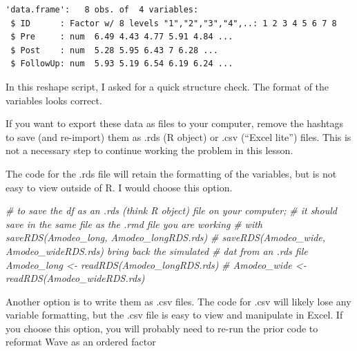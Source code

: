 \documentclass[
  11pt,
]{book}
\newenvironment{Shaded}{\begin{snugshade}}{\end{snugshade}}
\newcommand{\CommentTok}[1]{\textcolor[rgb]{0.56,0.35,0.01}{\textit{#1}}}
\newcommand{\FunctionTok}[1]{\textcolor[rgb]{0.00,0.00,0.00}{#1}}
\newcommand{\NormalTok}[1]{#1}
\newcommand{\OtherTok}[1]{\textcolor[rgb]{0.56,0.35,0.01}{#1}}
\newcommand{\SpecialCharTok}[1]{\textcolor[rgb]{0.00,0.00,0.00}{#1}}
\begin{document}
\begin{verbatim}
'data.frame':   8 obs. of  4 variables:
 $ ID      : Factor w/ 8 levels "1","2","3","4",..: 1 2 3 4 5 6 7 8
 $ Pre     : num  6.49 4.43 4.77 5.91 4.84 ...
 $ Post    : num  5.28 5.95 6.43 7 6.28 ...
 $ FollowUp: num  5.93 5.19 6.54 6.19 6.24 ...
\end{verbatim}

\begin{Shaded}
\end{Shaded}

In this reshape script, I asked for a quick structure check. The format of the variables looks correct.

If you want to export these data as files to your computer, remove the hashtags to save (and re-import) them as .rds (R object) or .csv (``Excel lite'') files. This is not a necessary step to continue working the problem in this lesson.

The code for the .rds file will retain the formatting of the variables, but is not easy to view outside of R. I would choose this option.

\begin{Shaded}
\begin{Highlighting}[]
\CommentTok{\# to save the df as an .rds (think \textquotesingle{}R object\textquotesingle{}) file on your computer;}
\CommentTok{\# it should save in the same file as the .rmd file you are working}
\CommentTok{\# with saveRDS(Amodeo\_long, \textquotesingle{}Amodeo\_longRDS.rds\textquotesingle{})}
\CommentTok{\# saveRDS(Amodeo\_wide, \textquotesingle{}Amodeo\_wideRDS.rds\textquotesingle{}) bring back the simulated}
\CommentTok{\# dat from an .rds file Amodeo\_long \textless{}{-} readRDS(\textquotesingle{}Amodeo\_longRDS.rds\textquotesingle{})}
\CommentTok{\# Amodeo\_wide \textless{}{-} readRDS(\textquotesingle{}Amodeo\_wideRDS.rds\textquotesingle{})}
\end{Highlighting}
\end{Shaded}

Another option is to write them as .csv files. The code for .csv will likely lose any variable formatting, but the .csv file is easy to view and manipulate in Excel. If you choose this option, you will probably need to re-run the prior code to reformat Wave as an ordered factor
\end{document}
